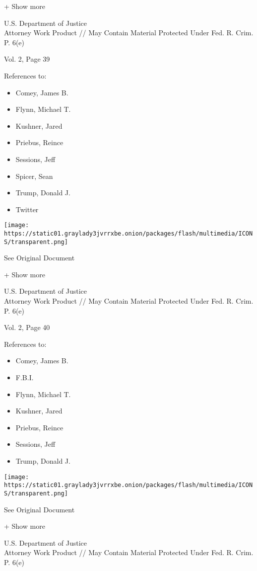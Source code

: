 + Show more

U.S. Department of Justice\\
Attorney Work Product // May Contain Material Protected Under Fed. R.
Crim. P. 6(e)

Vol. 2, Page 39

References to:

\begin{itemize}
\tightlist
\item
  Comey, James B.
\item
  Flynn, Michael T.
\item
  Kushner, Jared
\item
  Priebus, Reince
\item
  Sessions, Jeff
\item
  Spicer, Sean
\item
  Trump, Donald J.
\item
  Twitter
\end{itemize}

\protect\hyperlink{}{}

\texttt{[image: https://static01.graylady3jvrrxbe.onion/packages/flash/multimedia/ICONS/transparent.png]}

See Original Document

+ Show more

U.S. Department of Justice\\
Attorney Work Product // May Contain Material Protected Under Fed. R.
Crim. P. 6(e)

Vol. 2, Page 40

References to:

\begin{itemize}
\tightlist
\item
  Comey, James B.
\item
  F.B.I.
\item
  Flynn, Michael T.
\item
  Kushner, Jared
\item
  Priebus, Reince
\item
  Sessions, Jeff
\item
  Trump, Donald J.
\end{itemize}

\protect\hyperlink{}{}

\texttt{[image: https://static01.graylady3jvrrxbe.onion/packages/flash/multimedia/ICONS/transparent.png]}

See Original Document

+ Show more

U.S. Department of Justice\\
Attorney Work Product // May Contain Material Protected Under Fed. R.
Crim. P. 6(e)

